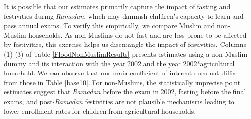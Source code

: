 \documentclass[12pt,letterpaper]{article}
\newcommand{\0}{\ensuremath{\mbox{\boldmath $0$}}}
\begin{document}
It is possible that our estimates primarily capture the impact of fasting and festivities during \textit{Ramadan}, which may diminish children's capacity to learn and pass annual exams. To verify this empirically, we compare Muslim and non-Muslim households. As non-Muslims do not fast and are less prone to be affected by festivities, this exercise helps us disentangle the impact of festivities. Columns (1)-(3) of Table \ref{FloodNonMuslimResults} presents estimates using a non-Muslim dummy and its interaction with the year 2002 and the year 2002*agricultural household. We can observe that our main coefficient of interest does not differ from those in Table \ref{base10}. For non-Muslims, the statistically imprecise point estimates suggest that \textit{Ramadan} before the exam in 2002, fasting before the final exams, and post-\textit{Ramadan} festivities are not plausible mechanisms leading to lower enrollment rates for children from agricultural households.


\end{document}
